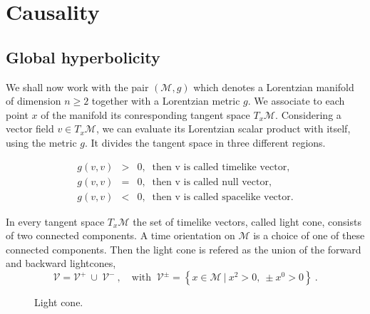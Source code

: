 \documentclass[10pt]{book}
\newcommand{\Mcal}{\mathcal{M}}
\newcommand{\Vcal}{\mathcal{V}}
\theoremstyle{break}
\begin{document}
\section{Causality}


\subsection{Global hyperbolicity}


We shall now work with the pair $(\Mcal,g)$ which denotes a Lorentzian manifold of dimension $n \geq 2$ together with a Lorentzian metric $g$. We associate to each point $x$ of the manifold its conresponding tangent space $T_x\Mcal$. Considering a vector field $v \in T_x\Mcal$, we can evaluate its Lorentzian scalar product with itself, using the metric $g$. It divides the tangent space in three different regions.


\begin{eqnarray*}
g(v,v) &>& 0 , \ \mbox{ then v is called timelike vector}, \\ 
g(v,v) &=& 0 , \ \mbox{ then v is called null vector}, \\ 
g(v,v) &<& 0 , \ \mbox{ then v is called spacelike vector}.
\end{eqnarray*}


In every tangent space $T_x\Mcal$ the set of timelike vectors, called light cone, consists of two connected components. A time orientation on $\Mcal$ is a choice of one of these connected components. Then the light cone is refered as the union of the forward and backward lightcones, 
%
\begin{equation*}
\Vcal=\Vcal^{+} \ \cup \ \Vcal^{-} \ , \quad \mbox{with } \ \Vcal^{\pm}=\left\{ x\in\Mcal \ | \ x^{2}>0, \ \pm x^{0}>0 \right\} \ . 
\end{equation*}


\begin{figure}[ht!]
%
\begin{center}
%
%
\end{center}
%
\caption{Light cone.}
%
\end{figure}
\end{document}
